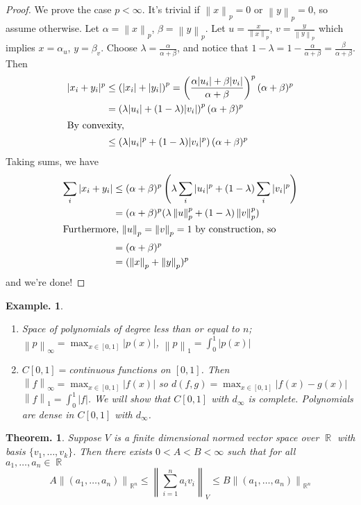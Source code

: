 \documentclass[11pt, a4paper]{memoir}
\DeclareMathOperator{\R}{{\mathbb{R}}}
\newcommand{\norm}[1]{\ensuremath{\left\lVert#1\right\rVert}}
\theoremstyle{change}
\newtheorem{theorem}{Theorem.}[section]
\theoremstyle{plain}
\theoremstyle{nonumberplain}
\newtheorem{example}{Example.}
\newtheorem{proof}{Proof}
\numberwithin{equation}{section}
\begin{document}
\begin{proof}
    We prove the case $p<\infty$. It's trivial if $\norm{x}_p=0$ or $\norm{y}_p=0$, so assume otherwise. Let $\alpha=\norm{x}_p$,
    $\beta=\norm{y}_p$. Let $u=\frac{x}{\norm{x}_p}$, $v=\frac{y}{\norm{y}_p}$ which implies $x=\alpha_u$, $y=\beta_v$.
    Choose $\lambda=\frac{\alpha}{\alpha+\beta}$, and notice that $1-\lambda=1-\frac{\alpha}{\alpha+\beta}=\frac{\beta}{\alpha+\beta}$.
    Then
    \begin{align*}
        |x_i+y_i|^p &\leq \left( |x_i|+|y_i| \right)^p = \left( \frac{\alpha|u_i|+\beta|v_i|}{\alpha+\beta} \right)^p(\alpha+\beta)^p\\
        &= \left( \lambda|u_i|+(1-\lambda)|v_i| \right)^p(\alpha+\beta)^p\\
        \intertext{By convexity,}
        &\leq \left( \lambda|u_i|^p+(1-\lambda)|v_i|^p \right)(\alpha+\beta)^p
    \end{align*}
    Taking sums, we have
    \begin{align*}
        \sum\limits_i|x_i+y_i| &\leq (\alpha+\beta)^p\left( \lambda\sum\limits_i|u_i|^p+(1-\lambda)\sum\limits_i|v_i|^p \right)\\
        &= (\alpha+\beta)^p(\lambda\norm{u}_p^p+(1-\lambda)\norm{v}_p^p)\\
        \intertext{Furthermore, $\norm{u}_p=\norm{v}_p=1$ by construction, so}
        &= (\alpha+\beta)^p\\
        &= (\norm{x}_p+\norm{y}_p)^p
    \end{align*}
    and we're done!
\end{proof}
\begin{example}
    \begin{enumerate}
        \item Space of polynomials of degree less than or equal to $n$; $\norm{p}_\infty=\max_{x\in[0,1]}|p(x)|$,
            $\norm{p}_1=\int_0^1|p(x)|$
        \item $C[0,1]=$continuous functions on $[0,1]$. Then $\norm{f}_\infty=\max_{x\in[0,1]}|f(x)|$ so $d(f,g)=\max_{x\in[0,1]}|f(x)-g(x)|$
            $\norm{f}_1=\int_0^1|f|$. We will show that $C[0,1]$ with $d_\infty$ is complete. Polynomials are dense in $C[0,1]$ with
            $d_\infty$.
    \end{enumerate}
\end{example}
\begin{theorem}
    Suppose $V$ is a finite dimensional normed vector space over $\R$ with basis $\{v_1,\ldots,v_k\}$. Then there
    exists $0<A<B<\infty$ such that for all $a_1,\ldots,a_n\in\R$
    \[A\norm{(a_1,\ldots,a_n)}_{\R^n}\leq \norm{\sum\limits_{i=1}^na_iv_i}_V\leq B\norm{(a_1,\ldots,a_n)}_{\R^n}\]
\end{theorem}
\end{document}

